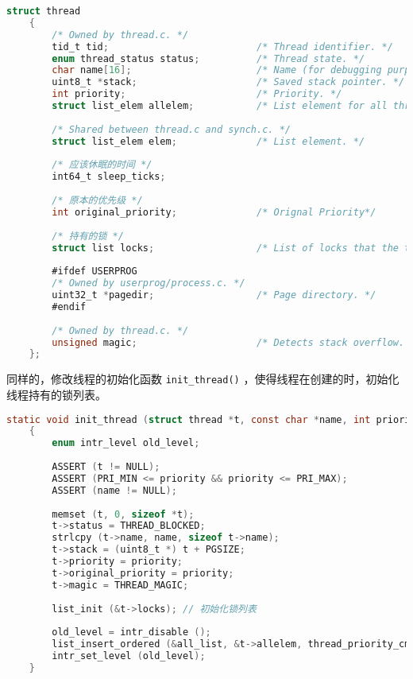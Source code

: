 \documentclass{article}
\begin{document}
	\begin{lstlisting}[language=C, title=修改后的线程结构体]
    struct thread
    {
    	/* Owned by thread.c. */
    	tid_t tid;                          /* Thread identifier. */
    	enum thread_status status;          /* Thread state. */
    	char name[16];                      /* Name (for debugging purposes). */
    	uint8_t *stack;                     /* Saved stack pointer. */
    	int priority;                       /* Priority. */
    	struct list_elem allelem;           /* List element for all threads list. */
    	
    	/* Shared between thread.c and synch.c. */
    	struct list_elem elem;              /* List element. */
    	
    	/* 应该休眠的时间 */
    	int64_t sleep_ticks;
    	
    	/* 原本的优先级 */
    	int original_priority;              /* Orignal Priority*/
    	
    	/* 持有的锁 */
    	struct list locks;                  /* List of locks that the thread is holding. */
    	
    	#ifdef USERPROG
    	/* Owned by userprog/process.c. */
    	uint32_t *pagedir;                  /* Page directory. */
    	#endif
    	
    	/* Owned by thread.c. */
    	unsigned magic;                     /* Detects stack overflow. */
    };
	\end{lstlisting}
	
	同样的，修改线程的初始化函数 \texttt{init\_thread()} ，使得线程在创建的时，初始化线程持有的锁列表。
	
	\begin{lstlisting}[language=C, title=修改后的\texttt{init\_thread()}函数]
    static void init_thread (struct thread *t, const char *name, int priority)
    {
    	enum intr_level old_level;
    	
    	ASSERT (t != NULL);
    	ASSERT (PRI_MIN <= priority && priority <= PRI_MAX);
    	ASSERT (name != NULL);
    	
    	memset (t, 0, sizeof *t);
    	t->status = THREAD_BLOCKED;
    	strlcpy (t->name, name, sizeof t->name);
    	t->stack = (uint8_t *) t + PGSIZE;
    	t->priority = priority;
    	t->original_priority = priority;
    	t->magic = THREAD_MAGIC;
    	
    	list_init (&t->locks); // 初始化锁列表
    	
    	old_level = intr_disable ();
    	list_insert_ordered (&all_list, &t->allelem, thread_priority_cmp, NULL);
    	intr_set_level (old_level);
    }
	\end{lstlisting}
	
\end{document}
